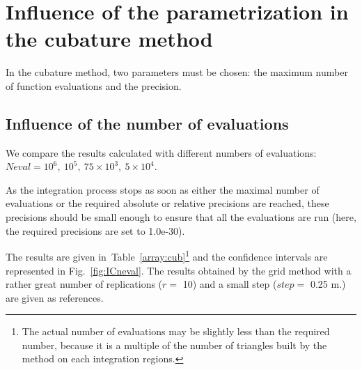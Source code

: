 \section{Influence of the parametrization in the cubature method}

In the cubature method, two parameters must be chosen:
the maximum number of function evaluations and
the precision.

 
\subsection{Influence of the number of evaluations}


We compare the results calculated with
different numbers of evaluations:
$Neval=10^6,~10^5,~75\times10^3,~5\times10^4$.

As the integration process stops as soon as either 
the maximal number of evaluations
or
the required absolute or relative 
 precisions
are reached, these precisions 
 should be small enough to ensure that 
all the evaluations are run (here, the required precisions are set
to 1.0e-30).

The results are given in~Table~\ref{array:cub}\footnote{
The actual number of evaluations  may be 
slightly less than the required number, because it is a multiple
of the number of triangles built by the method on 
each integration regions.
}
and
the confidence intervals are represented in Fig.~\ref{fig:ICneval}.
The results obtained by the grid method with a rather
 great number of replications ($r=$ 10) and a small step
($step =$ 0.25 m.) are given as references.


